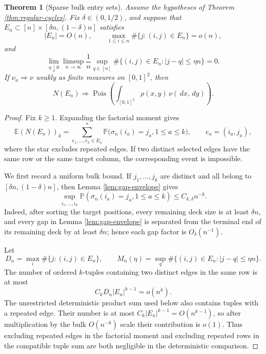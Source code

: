 \documentclass[11pt]{article}
\newtheorem{theorem}{Theorem}[section]
\theoremstyle{remark}
\newcommand{\Pp}{\mathbb P}
\newcommand{\Ee}{\mathbb E}
\newcommand{\Pois}{\operatorname{Pois}}
\newcommand{\dd}{\,d}
\begin{document}
\begin{theorem}[Sparse bulk entry sets]\label{thm:sparse-entry}
Assume the hypotheses of Theorem \ref{thm:regular-cycles}.  Fix
$\delta\in(0,1/2)$, and suppose that $E_n\subset[n]\times
[\delta n,(1-\delta)n]$ satisfies
\[
        |E_n|=O(n),
        \qquad
        \max_{1\le i\le n}\#\{j:(i,j)\in E_n\}=o(n),
\]
and
\[
        \lim_{\eta\downarrow0}\limsup_{n\to\infty}
        \frac1n\sup_{q\in[n]}
        \#\{(i,j)\in E_n:|j-q|\le\eta n\}=0.
\]
If $\nu_n\Rightarrow\nu$ weakly as finite measures on $[0,1]^2$, then
\[
        N(E_n)\Rightarrow
        \Pois\!\left(\int_{[0,1]^2}\rho(x,y)\,\nu(\dd x,\dd y)\right).
\]
\end{theorem}

\begin{proof}
Fix $k\ge1$.  Expanding the factorial moment gives
\[
        \Ee(N(E_n))_k
        =\sum_{e_1,\ldots,e_k\in E_n}^{*}
        \Pp\bigl(\sigma_n(i_a)=j_a,
        1\le a\le k\bigr),
        \qquad e_a=(i_a,j_a),
\]
where the star excludes repeated edges.  If two distinct selected edges have the
same row or the same target column, the corresponding event is impossible.

We first record a uniform bulk bound.  If $j_1,\ldots,j_k$ are distinct and all
belong to $[\delta n,(1-\delta)n]$, then Lemma
\ref{lem:gap-envelope} gives
\[
        \sup_{i_1,\ldots,i_k}
        \Pp(\sigma_n(i_a)=j_a,1\le a\le k)
        \le C_{k,\delta}n^{-k}.
\]
Indeed, after sorting the target positions, every remaining deck size is at
least $\delta n$, and every gap in Lemma \ref{lem:gap-envelope} is separated
from the terminal end of its remaining deck by at least $\delta n$; hence each
gap factor is $O_\delta(n^{-1})$.

Let
\[
        D_n=\max_i\#\{j:(i,j)\in E_n\},
        \qquad
        M_n(\eta)=\sup_q
        \#\{(i,j)\in E_n:|j-q|\le\eta n\}.
\]
The number of ordered $k$-tuples containing two distinct edges in the same row
is at most
\[
        C_k D_n|E_n|^{k-1}=o(n^k).
\]
The unrestricted deterministic product sum used below also contains tuples
with a repeated edge.  Their number is at most
\(C_k|E_n|^{k-1}=O(n^{k-1})\), so after multiplication by the bulk
\(O(n^{-k})\) scale their contribution is \(o(1)\).  Thus excluding repeated
edges in the factorial moment and excluding repeated rows in the compatible
tuple sum are both negligible in the deterministic comparison.


\end{proof}
\end{document}
